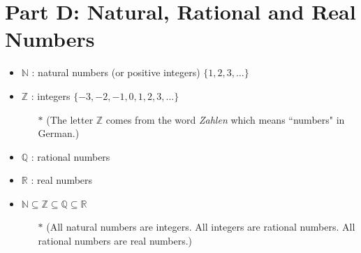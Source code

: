 \documentclass[]{report}
\begin{document}
\section*{Part D: Natural, Rational and Real Numbers}
\begin{framed}
\begin{itemize}
\item $\mathbb{N}$ : natural numbers (or positive integers) $\{1,2,3,\ldots\}$
\item $\mathbb{Z}$ : integers $\{-3,-2,-1,0,1,2,3,\ldots\}$
\begin{itemize}
\item[$\ast$] (The letter $\mathbb{Z}$ comes from the word \emph{Zahlen} which means ``numbers" in German.)
\end{itemize}
\item $\mathbb{Q}$ : rational numbers
\item $\mathbb{R}$ : real numbers
\item $\mathbb{N} \subseteq \mathbb{Z } \subseteq \mathbb{Q} \subseteq \mathbb{R}$
\begin{itemize}
\item[$\ast$] (All natural numbers are integers. All integers are rational numbers. All rational numbers are real numbers.)
\end{itemize}
\end{itemize}
\end{framed}
\end{document}
